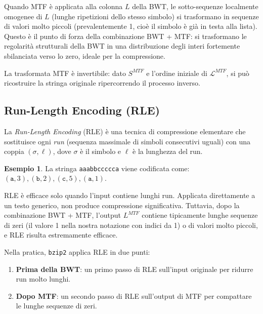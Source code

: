 \documentclass[12pt, a4paper, oneside]{book}
\theoremstyle{plain}
\theoremstyle{definition}
\newtheorem{esempio}[teorema]{Esempio}
\theoremstyle{remark}
\begin{document}
Quando MTF è applicata alla colonna $L$ della BWT, le sotto-sequenze localmente omogenee di $L$ (lunghe ripetizioni dello stesso simbolo) si trasformano in sequenze di valori molto piccoli (prevalentemente 1, cioè il simbolo è già in testa alla lista). Questo è il punto di forza della combinazione BWT + MTF: si trasformano le regolarità strutturali della BWT in una distribuzione degli interi fortemente sbilanciata verso lo zero, ideale per la compressione.

La trasformata MTF è invertibile: dato $S^{MTF}$ e l'ordine iniziale di $\mathcal{L}^{MTF}$, si può ricostruire la stringa originale ripercorrendo il processo inverso.

\subsection{Run-Length Encoding (RLE)}
\label{subsec:rle}

La \emph{Run-Length Encoding} (RLE) è una tecnica di compressione elementare che sostituisce ogni \emph{run} (sequenza massimale di simboli consecutivi uguali) con una coppia $(\sigma, \ell)$, dove $\sigma$ è il simbolo e $\ell$ è la lunghezza del run.

\begin{esempio}
La stringa \texttt{aaabbccccca} viene codificata come: $(\texttt{a}, 3), (\texttt{b}, 2), (\texttt{c}, 5), (\texttt{a}, 1)$.
\end{esempio}

RLE è efficace solo quando l'input contiene lunghi run. Applicata direttamente a un testo generico, non produce compressione significativa. Tuttavia, dopo la combinazione BWT + MTF, l'output $L^{MTF}$ contiene tipicamente lunghe sequenze di zeri (il valore 1 nella nostra notazione con indici da 1) o di valori molto piccoli, e RLE risulta estremamente efficace.

Nella pratica, \texttt{bzip2} applica RLE in due punti:
\begin{enumerate}
  \item \textbf{Prima della BWT}: un primo passo di RLE sull'input originale per ridurre run molto lunghi.
  \item \textbf{Dopo MTF}: un secondo passo di RLE sull'output di MTF per compattare le lunghe sequenze di zeri.
\end{enumerate}

\end{document}
